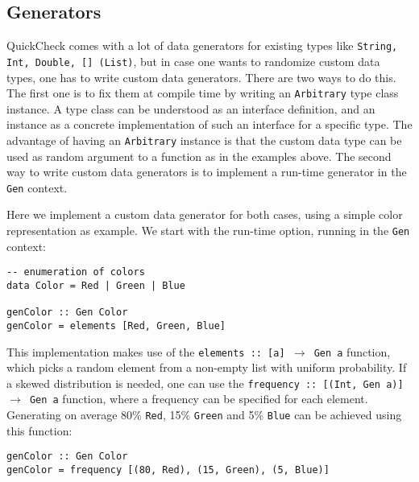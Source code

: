 \subsection{Generators}
QuickCheck comes with a lot of data generators for existing types like \texttt{String, Int, Double, [] (List)}, but in case one wants to randomize custom data types, one has to write custom data generators. There are two ways to do this. The first one is to fix them at compile time by writing an \texttt{Arbitrary} type class instance. A type class can be understood as an interface definition, and an instance as a concrete implementation of such an interface for a specific type. The advantage of having an \texttt{Arbitrary} instance is that the custom data type can be used as random argument to a function as in the examples above. The second way to write custom data generators is to implement a run-time generator in the \texttt{Gen} context.

Here we implement a custom data generator for both cases, using a simple color representation as example. We start with the run-time option, running in the \texttt{Gen} context:

\begin{footnotesize}
\begin{verbatim}
-- enumeration of colors
data Color = Red | Green | Blue

genColor :: Gen Color
genColor = elements [Red, Green, Blue]
\end{verbatim}
\end{footnotesize}

This implementation makes use of the \texttt{elements :: [a] $\rightarrow$ Gen a} function, which picks a random element from a non-empty list with uniform probability. If a skewed distribution is needed, one can use the \texttt{frequency :: [(Int, Gen a)] $\rightarrow$ Gen a} function, where a frequency can be specified for each element. Generating on average 80\% \texttt{Red}, 15\% \texttt{Green} and 5\% \texttt{Blue} can be achieved using this function:

\begin{footnotesize}
\begin{verbatim}
genColor :: Gen Color
genColor = frequency [(80, Red), (15, Green), (5, Blue)]
\end{verbatim}
\end{footnotesize}

